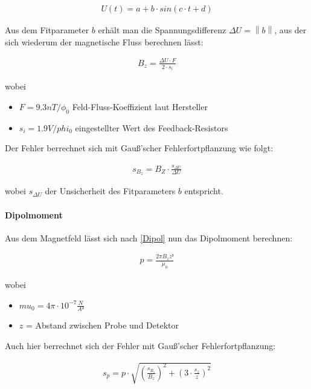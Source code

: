\documentclass[12pt]{article}
\begin{document}
\begin{align}
U(t) = a + b\cdot sin(c\cdot t+d) \label{U}
\end{align}

Aus dem Fitparameter $b$ erhält man die Spannungsdifferenz $\Delta U = \left\| b \right\| $, aus der sich wiederum der magnetische Fluss berechnen lässt:

\begin{align}
B_z = \frac{\Delta U \cdot F }{2 \cdot s_i} \label{B}
\end{align}

wobei 

\begin{itemize}
\item $ F = 9.3 nT/\phi_0$  Feld-Fluss-Koeffizient laut Hersteller
\item $s_i = 1.9 V/phi_{0}$ eingestellter Wert des Feedback-Resistors
\end{itemize}

Der Fehler berrechnet sich mit Gauß'scher Fehlerfortpflanzung wie folgt:

\begin{align}
s_{B_z} = B_Z \cdot \frac{s_{\Delta U}}{\Delta U}
\end{align}

wobei $s_{\Delta U}$ der Unsicherheit des Fitparameters $b$ entspricht.

\paragraph{Dipolmoment} Aus dem Magnetfeld lässt sich nach \ref{Dipol} nun das Dipolmoment berechnen:

\begin{align}
p = \frac{2\pi B_z z³}{\mu_0} \label{p}
\end{align}

wobei 
\begin{itemize}
\item $mu_0 = 4 \pi \cdot 10^{-7} \frac{N}{A²}$
\item $z$ = Abstand zwischen Probe und Detektor
\end{itemize}

Auch hier berrechnet sich der Fehler mit Gauß'scher Fehlerfortpflanzung:

\begin{align}
s_p = p \cdot \sqrt{\left( \frac{s_{B_z}}{B_z}\right)^2  + \left(3\cdot \frac{s_z}{z}\right)^2}
\end{align}
\end{document}
